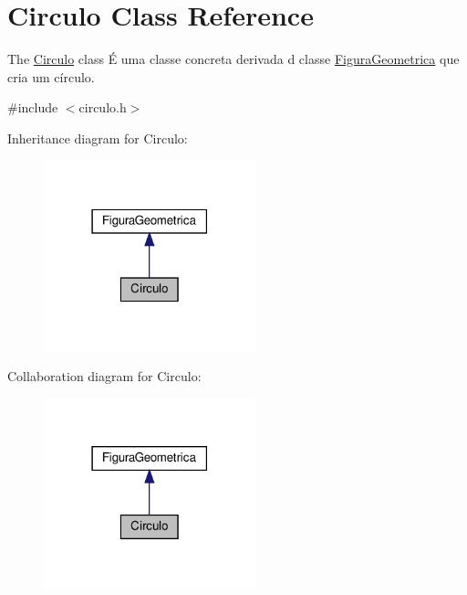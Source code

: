 \hypertarget{class_circulo}{}\section{Circulo Class Reference}
\label{class_circulo}


The \hyperlink{class_circulo}{Circulo} class É uma classe concreta derivada d classe \hyperlink{class_figura_geometrica}{Figura\+Geometrica} que cria um círculo.  




{\ttfamily \#include $<$circulo.\+h$>$}



Inheritance diagram for Circulo\+:
\nopagebreak
\begin{figure}[H]
\begin{center}
\leavevmode
\includegraphics[width=174pt]{class_circulo__inherit__graph}
\end{center}
\end{figure}


Collaboration diagram for Circulo\+:
\nopagebreak
\begin{figure}[H]
\begin{center}
\leavevmode
\includegraphics[width=174pt]{class_circulo__coll__graph}
\end{center}
\end{figure}

